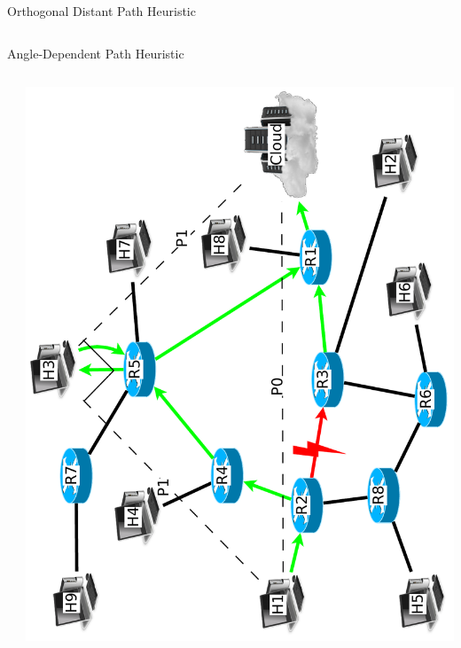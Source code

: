 \documentclass[pdftex]{beamer}
\begin{document}
\begin{frame}{Orthogonal Distant Path Heuristic}
\begin{columns}
\begin{frame}{Angle-Dependent Path Heuristic}
\begin{columns}

\begin{column}{.5\textwidth}
\begin{algorithm}[H]
\DontPrintSemicolon
{}
\SetAlgoLined
\SetAlgoLongEnd
\scriptsize
{}
\caption{Angle-Dependent Path Heuristic Algorithms}
\small
\end{algorithm}
\end{column}
	
\begin{column}{.5\textwidth}
\includegraphics[height=\textwidth,angle=-90]{angular_path}
\end{column}

\end{columns}
\end{frame}



\end{columns}
\end{frame}
\end{document}
